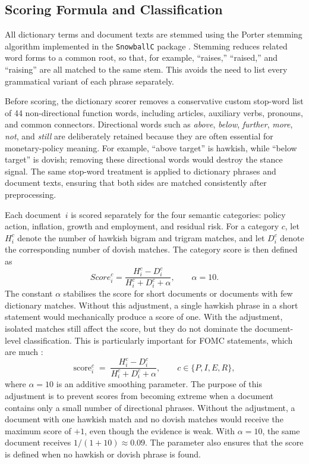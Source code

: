 \subsection{Scoring Formula and Classification}
\label{sec:meth_scoring}
\label{sec:meth_dict_stemming}
\label{sec:meth_dict_ngrams}
\label{sec:meth_threshold}

All dictionary terms and document texts are stemmed using the Porter
stemming algorithm implemented in the \texttt{SnowballC} package
\citep{porter1980}. Stemming reduces related word forms to a common
root, so that, for example, ``raises,'' ``raised,'' and ``raising''
are all matched to the same stem. This avoids the need to list every
grammatical variant of each phrase separately.

Before scoring, the dictionary scorer removes a conservative custom
stop-word list of 44 non-directional function words, including
articles, auxiliary verbs, pronouns, and common connectors. Directional
words such as \emph{above}, \emph{below}, \emph{further}, \emph{more},
\emph{not}, and \emph{still} are deliberately retained because they are
often essential for monetary-policy meaning. For example, ``above
target'' is hawkish, while ``below target'' is dovish; removing these
directional words would destroy the stance signal. The same stop-word
treatment is applied to dictionary phrases and document texts, ensuring
that both sides are matched consistently after preprocessing.

Each document~$i$ is scored separately for the four semantic
categories: policy action, inflation, growth and employment, and
residual risk. For a category $c$, let $H^c_i$ denote the number of
hawkish bigram and trigram matches, and let $D^c_i$ denote the
corresponding number of dovish matches. The category score is then
defined as
\[
    Score^c_i =
    \frac{H^c_i - D^c_i}{H^c_i + D^c_i + \alpha},
    \qquad \alpha = 10.
\]
The constant $\alpha$ stabilises the score for short documents or
documents with few dictionary matches. Without this adjustment, a
single hawkish phrase in a short statement would mechanically produce
a score of one. With the adjustment, isolated matches still affect the
score, but they do not dominate the document-level classification.
This is particularly important for FOMC statements, which are much
\citet{gorodnichenko2023}:
%
\begin{equation}
\label{eq:catscore}
\text{score}^c_i \;=\; \frac{H^c_i - D^c_i}{H^c_i + D^c_i + \alpha},
  \qquad c \in \{P,I,E,R\},
\end{equation}
%
where $\alpha = 10$ is an additive smoothing parameter. The purpose
of this adjustment is to prevent scores from becoming extreme when a
document contains only a small number of directional phrases. Without
the adjustment, a document with one hawkish match and no dovish
matches would receive the maximum score of $+1$, even though the
evidence is weak. With $\alpha=10$, the same document receives
$1/(1+10) \approx 0.09$. The parameter also ensures that the score is
defined when no hawkish or dovish phrase is found.

